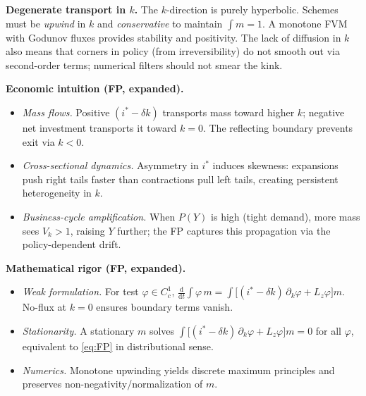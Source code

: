 ﻿\documentclass[11pt,letterpaper,oneside]{article}
\numberwithin{equation}{section}
\newcommand{\ac}[1]{{\mdseries\textsc{#1}}}
\newcommand{\1}{\mathbf{1}}
\newcommand{\Lz}{L_z}
\begin{document}
\begin{tcolorbox}[mathstyle]
\textbf{Degenerate transport in $k$.} The $k$-direction is purely hyperbolic. Schemes must be \emph{upwind} in $k$ and \emph{conservative} to maintain $\int m=1$. A monotone \ac{FVM} with Godunov fluxes provides stability and positivity. The lack of diffusion in $k$ also means that corners in policy (from irreversibility) do not smooth out via second-order terms; numerical filters should not smear the kink.
\end{tcolorbox}

\begin{tcolorbox}[didacticstyle]
\textbf{Economic intuition (FP, expanded).}
\begin{itemize}[leftmargin=1.15em,itemsep=0.25em]
  \item \emph{Mass flows.} Positive $(i^*-\delta k)$ transports mass toward higher $k$; negative net investment transports it toward $k=0$. The reflecting boundary prevents exit via $k<0$.
  \item \emph{Cross-sectional dynamics.} Asymmetry in $i^*$ induces skewness: expansions push right tails faster than contractions pull left tails, creating persistent heterogeneity in $k$.
  \item \emph{Business-cycle amplification.} When $P(Y)$ is high (tight demand), more mass sees $V_k>1$, raising $Y$ further; the FP captures this propagation via the policy-dependent drift.
\end{itemize}
\end{tcolorbox}

\begin{tcolorbox}[mathstyle]
\textbf{Mathematical rigor (FP, expanded).}
\begin{itemize}[leftmargin=1.15em,itemsep=0.25em]
  \item \emph{Weak formulation.} For test $\varphi\in C^1_c$, $\frac{\mathrm d}{\mathrm dt}\int \varphi\,m=\int \big[(i^*-\delta k)\,\partial_k\varphi + \Lz\varphi\big] m$. No-flux at $k=0$ ensures boundary terms vanish.
  \item \emph{Stationarity.} A stationary $m$ solves $\int \big[(i^*-\delta k)\,\partial_k\varphi + \Lz\varphi\big] m=0$ for all $\varphi$, equivalent to \eqref{eq:FP} in distributional sense.
  \item \emph{Numerics.} Monotone upwinding yields discrete maximum principles and preserves non-negativity/normalization of $m$.
\end{itemize}
\end{tcolorbox}
\end{document}
